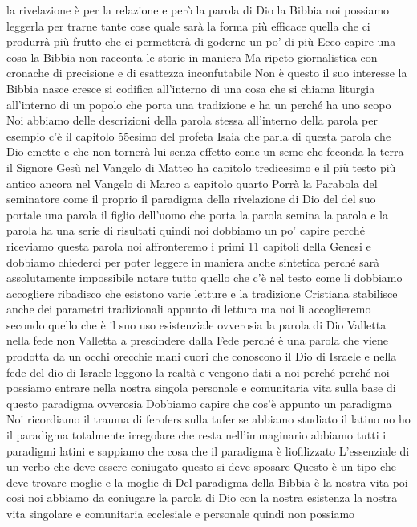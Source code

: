 la rivelazione è per la relazione e però la parola di Dio la Bibbia noi possiamo leggerla per trarne tante cose quale sarà la forma più efficace quella che ci produrrà più frutto che ci permetterà di goderne un po' di più Ecco capire una cosa la Bibbia non racconta le storie in maniera
Ma ripeto giornalistica con cronache di precisione e di esattezza inconfutabile Non è questo il suo interesse la Bibbia nasce cresce si codifica all'interno di una cosa che si chiama liturgia all'interno di un popolo che porta una tradizione e ha un perché ha uno scopo Noi abbiamo delle descrizioni della parola stessa all'interno della parola per esempio c'è il capitolo 55esimo del profeta Isaia che parla di questa parola che Dio emette e che non tornerà lui senza effetto come un seme che feconda la terra il Signore Gesù nel Vangelo di Matteo ha capitolo tredicesimo e il più testo più antico ancora nel Vangelo di Marco a capitolo quarto Porrà la Parabola del seminatore come il proprio il paradigma della rivelazione di Dio del del suo portale
una parola il figlio dell'uomo che porta la parola semina la parola e la parola ha una serie di risultati quindi noi dobbiamo un po' capire perché riceviamo questa parola noi affronteremo i primi 11 capitoli della Genesi e dobbiamo chiederci per poter leggere in maniera anche sintetica perché sarà assolutamente impossibile notare tutto quello che c'è nel testo come li dobbiamo accogliere ribadisco che esistono varie letture e la tradizione Cristiana stabilisce anche dei parametri tradizionali appunto di lettura ma noi li accoglieremo secondo quello che è il suo uso esistenziale ovverosia
la parola di Dio Valletta nella fede non Valletta a prescindere dalla Fede perché è una parola che viene prodotta da un occhi orecchie mani cuori che conoscono il Dio di Israele e nella fede del dio di Israele leggono la realtà e vengono dati a noi perché
 perché noi possiamo entrare nella nostra singola personale e comunitaria vita sulla base di questo paradigma ovverosia Dobbiamo capire che cos'è appunto un paradigma Noi ricordiamo il trauma di ferofers sulla tufer se abbiamo studiato il latino no ho il paradigma totalmente irregolare che resta nell'immaginario abbiamo tutti i paradigmi latini e sappiamo che cosa che il paradigma è liofilizzato L'essenziale di un verbo che deve essere coniugato questo si deve sposare Questo è un tipo che deve trovare moglie e la moglie di Del paradigma della Bibbia è la nostra vita poi così noi abbiamo da coniugare la parola di Dio con la nostra esistenza la nostra vita singolare e comunitaria ecclesiale e personale quindi non possiamo
